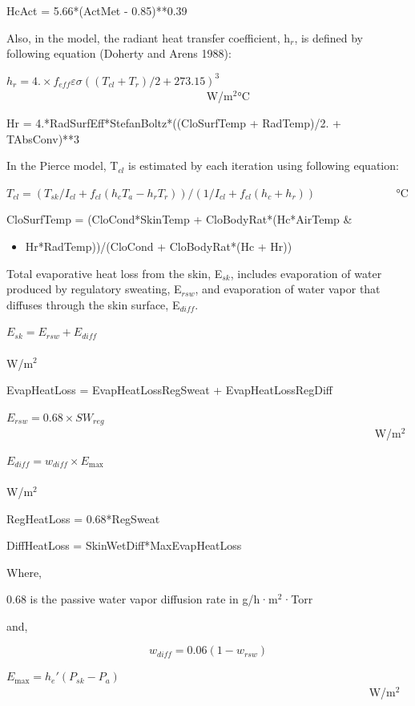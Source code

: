 HcAct = 5.66*(ActMet - 0.85)**0.39

Also, in the model, the radiant heat transfer coefficient, h\(_{r}\), is defined by following equation (Doherty and Arens 1988):

\({h_r} = 4. \times {f_{eff}}\varepsilon \sigma {(({T_{cl}} + {T_r})/2 + 273.15)^3}\) ~~~~~~~~~~~~~~~~~~~~~~~~~~~~~~~~~~~ W/m\(^{2}\)°C

Hr = 4.*RadSurfEff*StefanBoltz*((CloSurfTemp + RadTemp)/2. + TAbsConv)**3

In the Pierce model, T\(_{cl}\) is estimated by each iteration using following equation:

\({T_{cl}} = ({T_{sk}}/{I_{cl}} + {f_{cl}}({h_c}{T_a} - {h_r}{T_r}))/(1/{I_{cl}} + {f_{cl}}({h_c} + {h_r}))\) ~~~~~~~~~~~~~ °C

CloSurfTemp = (CloCond*SkinTemp + CloBodyRat*(Hc*AirTemp \&

\begin{itemize}
\tightlist
\item
  Hr*RadTemp))/(CloCond + CloBodyRat*(Hc + Hr))
\end{itemize}

Total evaporative heat loss from the skin, E\(_{sk}\), includes evaporation of water produced by regulatory sweating, E\(_{rsw}\), and evaporation of water vapor that diffuses through the skin surface, E\(_{diff}\).

\({E_{sk}} = {E_{rsw}} + {E_{diff}}\) ~~~~~~~~~~~~~~~~~~~~~~~~~~~~~~~~~~~~~~~~~~~~~~~~~~~~~~~~~~~~~~~~~~~~~ W/m\(^{2}\)

EvapHeatLoss = EvapHeatLossRegSweat + EvapHeatLossRegDiff

\({E_{rsw}} = 0.68 \times S{W_{reg}}\) ~~~~~~~~~~~~~~~~~~~~~~~~~~~~~~~~~~~~~~~~~~~~~~~~~~~~~~~~~~~~~~~~~ W/m\(^{2}\)

\({E_{diff}} = {w_{diff}} \times {E_{\max }}\) ~~~~~~~~~~~~~~~~~~~~~~~~~~~~~~~~~~~~~~~~~~~~~~~~~~~~~~~~~~~~~~~~~~~ W/m\(^{2}\)

RegHeatLoss = 0.68*RegSweat

DiffHeatLoss = SkinWetDiff*MaxEvapHeatLoss

Where,

0.68 is the passive water vapor diffusion rate in g/h·m\(^{2}\)·Torr

and,

\begin{equation}
{w_{diff}} = 0.06(1 - {w_{rsw}})
\end{equation}

\({E_{\max }} = {h_e}'({P_{sk}} - {P_a})\) ~~~~~~~~~~~~~~~~~~~~~~~~~~~~~~~~~~~~~~~~~~~~~~~~~~~~~~~~~~~~~~~~ W/m\(^{2}\)


